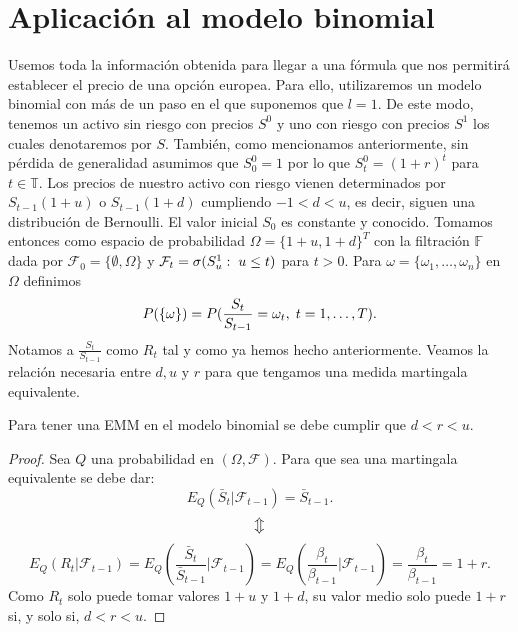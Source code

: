 \section{Aplicación al modelo binomial}
Usemos toda la información obtenida para llegar a una fórmula que nos permitirá establecer el precio de una opción europea. Para ello, utilizaremos un modelo binomial con más de un paso en el que suponemos que $ l = 1 $. De este modo, tenemos un activo sin riesgo con precios $ S^0 $ y uno con riesgo con precios $ S^1$ los cuales denotaremos por $ S $. También, como mencionamos anteriormente, sin pérdida de generalidad asumimos que $ S^0_0  = 1$ por lo que $ S_t^0 =  (1+r)^t $ para $ t \in \mathbb{T} $. Los precios de nuestro activo con riesgo vienen determinados por $ S_{t-1}(1+u) $ o $ S_{t-1}(1+d) $ cumpliendo $ -1 < d < u $, es decir, siguen una distribución de Bernoulli. El valor inicial $ S_0 $ es constante y conocido. Tomamos entonces como espacio de probabilidad $ \Omega = \{1+u,1+d\}^T $ con la filtración $ \mathbb{F} $ dada por $ \mathcal{F}_0 = \{\emptyset, \Omega\} $ y $ \mathcal{F}_t = \sigma(S_u^1: \hspace{1mm} u \leq t) $ para $ t >0 $. Para $ \omega = \{\omega_1,\dots,\omega_n\} $ en $ \Omega $ definimos
\[
P(\{\omega\}) = P(\frac{S_t}{S_{t-1}} = \omega_t, \hspace{1mm} t=1,\dots,T).
\]
Notamos a $ \frac{S_t}{S_{t-1}} $ como $ R_t $ tal y como ya hemos hecho anteriormente. Veamos la relación necesaria entre $ d,u \text{ y } r$ para que tengamos una medida martingala equivalente.
\bigskip
\begin{lemaBox}\label{cotasUpDown}
	Para tener una EMM en el modelo binomial se debe cumplir que $ d < r < u $.
\end{lemaBox}
\begin{proof}
	Sea $ Q $ una probabilidad en $ (\Omega, \mathcal{F}) $. Para que sea una martingala equivalente se debe dar:
	\[
	E_Q(\bar{S}_t | \mathcal{F}_{t-1}) = \bar{S}_{t-1}.
	\]
	\[
	\big\Updownarrow
	\]
	\[
	E_Q(R_t | \mathcal{F}_{t-1} ) = E_Q(\frac{\bar{S}_t}{\bar{S}_{t-1}} | \mathcal{F}_{t-1}) = E_Q(\frac{\beta_t}{\beta_{t-1}} | \mathcal{F}_{t-1}) = \frac{\beta_t}{\beta_{t-1}} = 1+r.
	\]
	Como $ R_t $ solo puede tomar valores $ 1+u $ y $ 1+d $, su valor medio solo puede $ 1+r $ si, y solo si, $ d < r < u $.
\end{proof}
\bigskip

